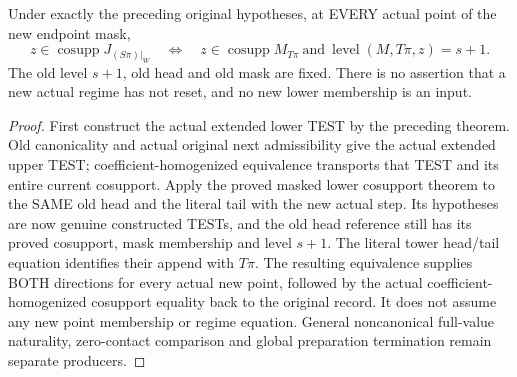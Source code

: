 \begin{theorem}
\label{hir:original-positive-stepone-cut-next-lower-cosupport}
\leanok
Under exactly the preceding original hypotheses, at EVERY actual point
of the new endpoint mask,
\[
 z\in\operatorname{cosupp}J_{(S\pi)|_W}
 \quad\Longleftrightarrow\quad
 z\in\operatorname{cosupp}M_{T\pi}
 \ \text{and}\ \operatorname{level}(M,T\pi,z)=s+1.
\]
The old level $s+1$, old head and old mask are fixed. There is no assertion
that a new actual regime has not reset, and no new lower membership is an
input.
\end{theorem}
\begin{proof}
First construct the actual extended lower TEST by the preceding theorem.
Old canonicality and actual original next admissibility give the actual
extended upper TEST; coefficient-homogenized equivalence transports that
TEST and its entire current cosupport. Apply the proved masked lower
cosupport theorem to the SAME old head and the literal tail with the new
actual step. Its hypotheses are now genuine constructed TESTs, and the old
head reference still has its proved cosupport, mask membership and level
$s+1$. The literal tower head/tail equation identifies their append with
$T\pi$. The resulting equivalence supplies BOTH directions for every
actual new point, followed by the actual coefficient-homogenized
cosupport equality back to the original record. It does not assume any
new point membership or regime equation. General noncanonical full-value
naturality, zero-contact comparison and global preparation termination
remain separate producers.
\end{proof}
